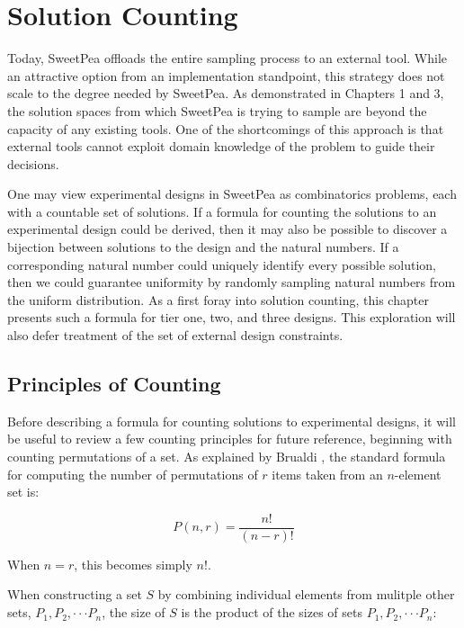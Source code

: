 
\chapter{Solution Counting}

Today, SweetPea offloads the entire sampling process to an external tool. While an attractive option from an implementation standpoint, this strategy does not scale to the degree needed by SweetPea. As demonstrated in Chapters 1 and 3, the solution spaces from which SweetPea is trying to sample are beyond the capacity of any existing tools. One of the shortcomings of this approach is that external tools cannot exploit domain knowledge of the problem to guide their decisions.

One may view experimental designs in SweetPea as combinatorics problems, each with a countable set of solutions. If a formula for counting the solutions to an experimental design could be derived, then it may also be possible to discover a bijection between solutions to the design and the natural numbers. If a corresponding natural number could uniquely identify every possible solution, then we could guarantee uniformity by randomly sampling natural numbers from the uniform distribution. As a first foray into solution counting, this chapter presents such a formula for tier one, two, and three designs. This exploration will also defer treatment of the set of external design constraints.


\section{Principles of Counting}

Before describing a formula for counting solutions to experimental designs, it will be useful to review a few counting principles for future reference, beginning with counting permutations of a set. As explained by Brualdi \cite{brualdi_introductory_2010}, the standard formula for computing the number of permutations of $r$ items taken from an $n$-element set is:

\[
P(n,r) = \frac{n!}{(n-r)!}
\]

When $n =  r$, this becomes simply $n!$.



When constructing a set $S$ by combining individual elements from mulitple other sets, $P_1, P_2, \cdot\cdot\cdot P_n$, the size of $S$ is the product of the sizes of sets $P_1, P_2, \cdot\cdot\cdot P_n$:

